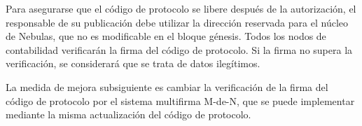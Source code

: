 Para asegurarse que el código de protocolo se libere después de la autorización, el responsable de su publicación debe utilizar la dirección reservada para el núcleo de Nebulas, que no es modificable en el bloque génesis. Todos los nodos de contabilidad verificarán la firma del código de protocolo. Si la firma no supera la verificación, se considerará que se trata de datos ilegítimos.

La medida de mejora subsiguiente es cambiar la verificación de la firma del código de protocolo por el sistema multifirma M-de-N, que se puede implementar mediante la misma actualización del código de protocolo.